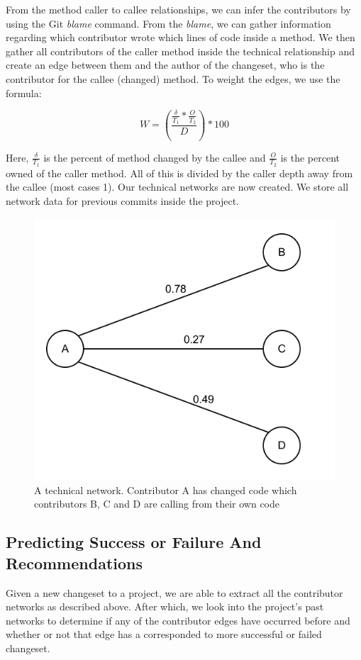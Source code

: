 \documentclass[conference]{IEEEtran}
\begin{document}
From the method caller to callee relationships, we can infer the contributors by using
the Git \textit{blame} command. From the \textit{blame}, we can gather information regarding which 
contributor  wrote which lines of code inside a method. We then gather all contributors of the 
caller method inside the technical relationship and create an edge between them and 
the author of the changeset, who is the contributor for the 
callee (changed) method. To weight the edges, we use the formula:

\begin{equation}\label{first}
W = (\frac{\frac{\delta}{T_{1}}*\frac{O}{T_{2}}}{D})*100
\end{equation}

Here, $\frac{\delta}{T_{1}}$ is the percent of method changed by the callee and $\frac{O}{T_{2}}$ 
is the percent owned of the caller method. All of this is divided by the caller depth away from 
the callee (most cases 1).  Our technical networks are now created. We store all network data for
previous commits inside the project.

\begin{figure}[tb!]
\centering
\includegraphics[width=0.5\columnwidth]{images/network}
\caption{A technical network. Contributor A has changed code which contributors B, C and D 
are calling from their own code}
\end{figure}

\subsection{Predicting Success or Failure And Recommendations}
Given a new changeset to a project, we are able to extract all the contributor networks as described
above. After which, we look into the project's past networks to determine if any of the contributor edges have
occurred before and whether or not that edge has a  corresponded to more successful or failed changeset. 
\end{document}
